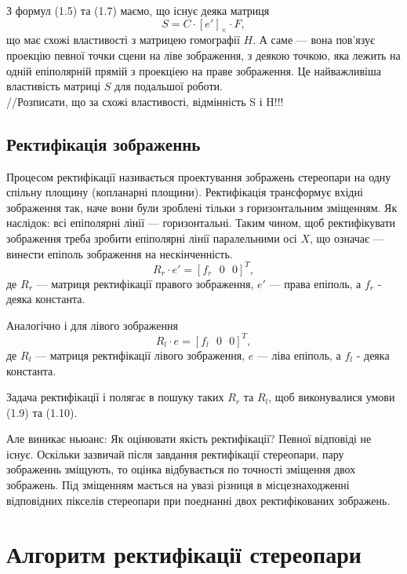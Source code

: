 З формул (1.5) та (1.7) маємо, що існує деяка матриця
\begin{equation}
S = C \cdot {[e']}_\times \cdot F,
\end{equation}
що має схожі властивості з матрицею гомографії $H$. А саме --- вона пов'язує 
проекцію певної точки сцени на ліве зображення, з деякою точкою, яка лежить на 
одній епіполярній прямій з проекціею на праве зображення. Це найважливіша 
властивість матриці $S$ для подальшої роботи.
\\//Розписати, що за схожі властивості, відмінність S і H!!!\\


\section{Ректифікація зображеннь}
Процесом ректифікації називається проектування зображень стереопари на одну 
спільну площину (копланарні площини). Ректифікація трансформує вхідні зображення 
так, наче вони були зроблені тільки з горизонтальним зміщенням. Як наслідок: всі 
епіполярні лінії --- горизонтальні. Таким чином, щоб ректифікувати зображення 
треба зробити епіполярні лінії паралельними осі $X$, що означає  --- винести 
епіполь зображення на нескінченність.
\begin{equation}
	R_r \cdot e' = {[f_r \:\:\: 0 \:\:\: 0]}^T,
\end{equation}
де $R_r$ --- матриця ректифікації правого зображення, $e'$ --- права епіполь, а 
$f_r$ - деяка константа.

Аналогічно і для лівого зображення
\begin{equation}
	R_l \cdot e = {[f_l \:\:\: 0 \:\:\: 0]}^T,
\end{equation}
де $R_l$ --- матриця ректифікації лівого зображення, $e$ --- ліва епіполь, а 
$f_l$ - деяка константа.

Задача ректифікації і полягає в пошуку таких $R_r$ та $R_l$, щоб виконувалися 
умови (1.9) та (1.10).

Але виникає ньюанс: Як оцінювати якість ректифікації? Певної відповіді не існує.
Оскільки зазвичай після завдання ректифікації стереопари, пару зображеннь
зміщують, то оцінка відбувається по точності зміщення двох зображень. Під 
зміщенням мається на увазі різниця в місцезнаходженні відповідних пікселів 
стереопари при поеднанні двох ректифікованих зображень. 



\chapter{Алгоритм ректифікації стереопари}



